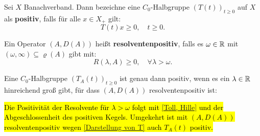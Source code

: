 

\begin{defi}
Sei $X$ Banachverband. Dann bezeichne eine $C_0$-Halbgruppe $(T(t))_{t\geq0}$ auf $X$ als \textbf{positiv}, falls für alle $x\in X_+$ gilt:
\begin{equation*}
T(t)x\geq0, \quad t\geq 0.
\end{equation*}
\end{defi}

\begin{defi}
Ein Operator $(A,D(A))$ heißt \textbf{resolventenpositiv}, falls es $\omega\in\mathbb{R}$ mit $(\omega,\infty)\subseteq \varrho(A)$ gibt mit:
\begin{equation*}
R(\lambda, A)\geq 0, \quad \forall \lambda >  \omega.
\end{equation*}
\end{defi}

\begin{bem}
Eine $C_0$-Halbgruppe $(T_A(t))_{t\geq0}$ ist genau dann positiv, wenn es ein $\lambda\in\mathbb{R}$ hinreichend groß gibt, für dass $(A, D(A))$ resolventenpositiv ist:

\par
\hl{Die Positivität der Resolvente für $\lambda >\omega$ folgt mit \ref{Toll, Hille} und der Abgeschlossenheit des positiven Kegels. Umgekehrt ist mit $(A, D(A))$ resolventenpositiv wegen \ref{Darstellung von T} auch  $T_A(t)$ positiv.}
\end{bem}


